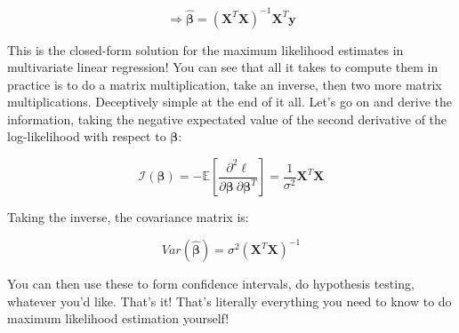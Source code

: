 \documentclass{article}
\begin{document}
\begin{equation}
\Rightarrow \boxed{\hat{\bm{\beta}} = (\mathbf{X}^T\mathbf{X})^{-1}\mathbf{X}^T\mathbf{y}}
\end{equation}

This is the closed-form solution for the maximum likelihood estimates in multivariate linear regression! You can see that all it takes to compute them in practice is to do a matrix multiplication, take an inverse, then two more matrix multiplications. Deceptively simple at the end of it all. Let's go on and derive the information, taking the negative expectated value of the second derivative of the log-likelihood with respect to $\bm{\beta}$:

\begin{equation}
\mathcal{I}(\bm{\beta}) = -\mathbb{E}\left[\frac{\partial^2 \ell}{\partial \bm{\beta} \ \partial\bm{\beta}^T}\right] = \frac{1}{\sigma^2}\mathbf{X}^T\mathbf{X}
\end{equation}

Taking the inverse, the covariance matrix is:

\begin{equation}
Var(\hat{\bm{\beta}}) = \sigma^2(\mathbf{X}^T\mathbf{X})^{-1}
\end{equation}

You can then use these to form confidence intervals, do hypothesis testing, whatever you'd like. That's it! That's literally everything you need to know to do maximum likelihood estimation yourself!
\end{document}
